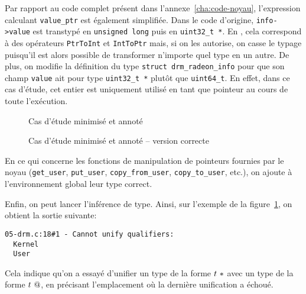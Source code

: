 Par rapport au code complet présent dans l'annexe~\ref{cha:code-noyau},
l'expression calculant \texttt{value_ptr} est également simplifiée. Dans le code
d'origine, \texttt{info->value} est transtypé en \texttt{unsigned long} puis en
\texttt{uint32\_t *}. En \newspeak, cela correspond à des opérateurs
\texttt{PtrToInt} \linebreak et \texttt{IntToPtr} mais, si on les autorise, on
casse le typage puisqu'il est alors possible de transformer n'importe quel type
en un autre. De plus, on modifie la définition du type \texttt{struct
drm\_radeon\_info} pour que son champ \texttt{value} ait pour type
\texttt{uint32\_t *} plutôt que \texttt{uint64\_t}. En effet, dans ce cas
d'étude, cet entier est uniquement utilisé en tant que pointeur au cours de
toute l'exécution.

\begin{figure}[p]

\caption{Cas d'étude minimisé et annoté}
\label{fig:ex-drm}
\end{figure}

\begin{figure}[p]


    \caption{Cas d'étude minimisé et annoté -- version correcte}
    \label{fig:ex-drm-ok}

\end{figure}

En ce qui concerne les fonctions de manipulation de pointeurs fournies
par le noyau (\texttt{get\_user}, \texttt{put\_user},
\texttt{copy\_from\_user}, \texttt{copy\_to\_user}, etc.), on ajoute à
l'environnement global leur type correct.

Enfin, on peut lancer l'inférence de type. Ainsi, sur l'exemple de la
figure~\ref{fig:ex-drm}, on obtient la sortie suivante:

\begin{Verbatim}
05-drm.c:18#1 - Cannot unify qualifiers:
  Kernel
  User
\end{Verbatim}

Cela indique qu'on a essayé d'unifier un type de la forme $t~*$ avec un
type de la forme $t~@$, en précisant l'emplacement où la dernière
unification a échoué.



